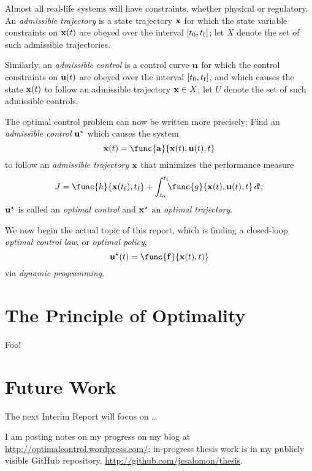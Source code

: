 \documentclass{article}
\begin{document}
\begin{defn}
	Almost all real-life systems will have constraints,
	whether physical or regulatory.
	An \emph{admissible trajectory}
	is a state trajectory \( {\mathbf{x}} \) for which
	the state variable constraints on \( {\mathbf{x}}(t) \) are obeyed
	over the interval \( [t_0, t_{\mathrm{f}}] \);
	let \( X \) denote the set of such admissible trajectories.
	\par
	Similarly, an \emph{admissible control}
	is a control curve \( {\mathbf{u}} \) for which
	the control constraints on \( {\mathbf{u}}(t) \) are obeyed
	over the interval \( [t_0, t_{\mathrm{f}}] \),
	and which causes the state \( {\mathbf{x}}(t) \) to follow
	an admissible trajectory \( {\mathbf{x}} \in X \);
	let \( U \) denote the set of such admissible controls.
\end{defn}

The optimal control problem can now be written more precisely:
Find an \emph{admissible control} \( {\mathbf{u}}^\star \)
which causes the system
\[
	\dot{\vecx}(t) =
		\func{\veca}{\vecx(t), \vecu(t), t}
\]
to follow an \emph{admissible trajectory} \( {\mathbf{x}} \)
that minimizes the performance measure
\[
	J = \func{h}{\vecx(t_\fl),t_\fl} +
		\intt{\func{g}{\vecx(t), \vecu(t), t} \dd t};
\]
\( {\mathbf{u}}^\star \) is called an \emph{optimal control} and
\( {\mathbf{x}}^\star \) an \emph{optimal trajectory}.

\bigskip\noindent
We now begin the actual topic of this report,
which is finding a closed-loop
\emph{optimal control law}, or \emph{optimal policy},
\[
	\vecu\opt(t) = \func{\mathbf{f}}{\vecx(t), t)}
\]
via \emph{dynamic programming}.

\section{The Principle of Optimality}
Foo!

\section{Future Work}
The next Interim Report will focus on …

I am posting notes on my progress on my blog at
\url{http://optimalcontrol.wordpress.com/};
in-progress thesis work is in my publicly visible GitHub repository,
\url{http://github.com/jcsalomon/thesis}.

\printbibliography[heading=bibintoc]
\end{document}
